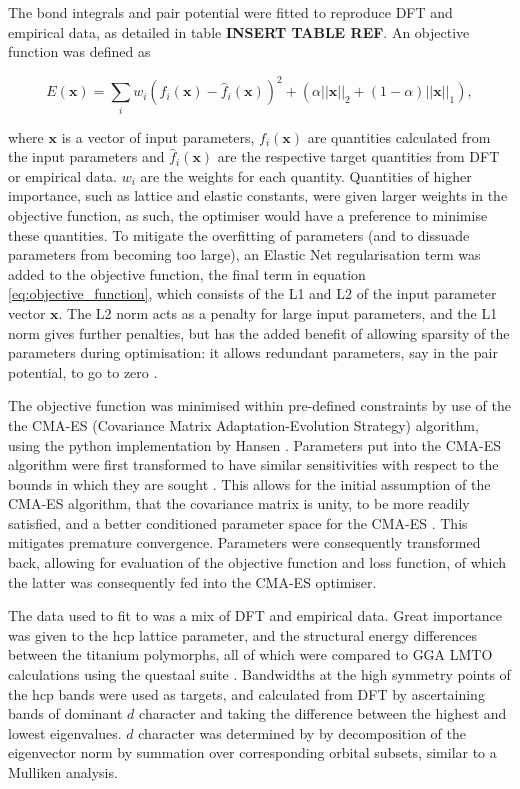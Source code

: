 \documentclass[a4paper,12pt,oneside,print,numbered,index,PageStyleIII]{PhDThesisPSnPDF}
\begin{document}
The bond integrals and pair potential were fitted to reproduce DFT
and empirical data, as detailed in table \textbf{INSERT TABLE REF}.
An objective function was defined as

\begin{equation}
  E(\mathbf{x}) = \sum_i
  w_i(f_i(\mathbf{x}) - \hat{f}_i (\mathbf{x}))^2 + \left(     \alpha
  ||\mathbf{x}||_2 + (1-\alpha) || \mathbf{x} ||_1 \right),
  \label{eq:objective_function}
\end{equation}

where \(\mathbf{x}\) is a vector of input parameters,
\(f_i(\mathbf{x})\) are quantities calculated from the input
parameters and \(\hat{f}_i(\mathbf{x})\) are the respective target
quantities from DFT or empirical data. \(w_i\) are the weights for
each quantity. Quantities of higher importance, such as lattice and
elastic constants, were given larger weights in the objective
function, as such, the optimiser would have a preference to
minimise these quantities. To mitigate the overfitting of
parameters (and to dissuade parameters from becoming too large), an
Elastic Net regularisation term was added to the objective
function, the final term in equation \eqref{eq:objective_function},
which consists of the L1 and L2 of the input parameter vector
\(\mathbf{x}\). The L2 norm acts as a penalty for large input
parameters, and the L1 norm gives further penalties, but has the
added benefit of allowing sparsity of the parameters during
optimisation: it allows redundant parameters, say in the pair
potential, to go to zero \cite{Hastie2009,Bishop2006}.

The objective function was minimised within pre-defined constraints
by use of the the CMA-ES (Covariance Matrix Adaptation-Evolution
Strategy) algorithm, using the python implementation by Hansen
\cite{hansen2019pycma}. Parameters put into the CMA-ES algorithm were
first transformed to have similar sensitivities with respect to the
bounds in which they are sought \cite{Hansen2016}. This allows for
the initial assumption of the CMA-ES algorithm, that the covariance
matrix is unity, to be more readily satisfied, and a better
conditioned parameter space for the CMA-ES
\cite{Jastrebski2006,Hansen2011}. This mitigates premature
convergence. Parameters were consequently transformed back,
allowing for evaluation of the objective function and loss
function, of which the latter was consequently fed into the CMA-ES
optimiser.


The data used to fit to was a mix of DFT and empirical data. Great
importance was given to the hcp lattice parameter, and the
structural energy differences between the titanium polymorphs, all
of which were compared to GGA LMTO calculations using the questaal
suite \cite{Pashov2020}. Bandwidths at the high symmetry points of
the hcp bands were used as targets, and calculated from DFT by
ascertaining bands of dominant \(d\) character and taking the
difference between the highest and lowest eigenvalues. \(d\)
character was determined by by decomposition of the eigenvector
norm by summation over corresponding orbital subsets, similar to a
Mulliken analysis.
\end{document}
